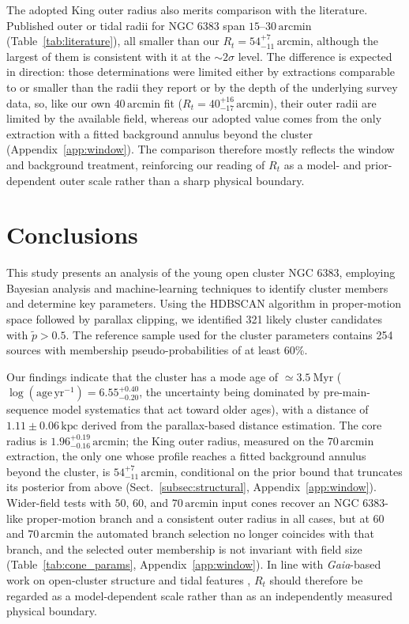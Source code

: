 \documentclass{aa}
\begin{document}
The adopted King outer radius also merits comparison with the literature. Published outer or tidal radii for NGC 6383 span $15$--$30\,\mathrm{arcmin}$ (Table~\ref{tab:literature}), all smaller than our $R_t=54^{+7}_{-11}\,\mathrm{arcmin}$, although the largest of them is consistent with it at the ${\sim}2\sigma$ level. The difference is expected in direction: those determinations were limited either by extractions comparable to or smaller than the radii they report or by the depth of the underlying survey data, so, like our own $40\,\mathrm{arcmin}$ fit ($R_t=40^{+16}_{-17}\,\mathrm{arcmin}$), their outer radii are limited by the available field, whereas our adopted value comes from the only extraction with a fitted background annulus beyond the cluster (Appendix~\ref{app:window}). The comparison therefore mostly reflects the window and background treatment, reinforcing our reading of $R_t$ as a model- and prior-dependent outer scale rather than a sharp physical boundary.

\section{Conclusions}\label{sec:conclusion}

This study presents an analysis of the young open cluster NGC 6383, employing Bayesian analysis and machine-learning techniques to identify cluster members and determine key parameters. Using the HDBSCAN algorithm in proper-motion space followed by parallax clipping, we identified 321 likely cluster candidates with $\tilde{p}>0.5$. The reference sample used for the cluster parameters contains 254 sources with membership pseudo-probabilities of at least 60\%.

Our findings indicate that the cluster has a mode age of $\simeq3.5~\mathrm{Myr}$ ($\log(\mathrm{age}\,\mathrm{yr^{-1}}) = 6.55^{+0.40}_{-0.20}$, the uncertainty being dominated by pre-main-sequence model systematics that act toward older ages), with a distance of $1.11 \pm 0.06\,\mathrm{kpc}$ derived from the parallax-based distance estimation. The core radius is $1.96^{+0.19}_{-0.16}\,\mathrm{arcmin}$; the King outer radius, measured on the $70\,\mathrm{arcmin}$ extraction, the only one whose profile reaches a fitted background annulus beyond the cluster, is $54^{+7}_{-11}\,\mathrm{arcmin}$, conditional on the prior bound that truncates its posterior from above (Sect.~\ref{subsec:structural}, Appendix~\ref{app:window}). Wider-field tests with $50$, $60$, and $70\,\mathrm{arcmin}$ input cones recover an NGC 6383-like proper-motion branch and a consistent outer radius in all cases, but at $60$ and $70\,\mathrm{arcmin}$ the automated branch selection no longer coincides with that branch, and the selected outer membership is not invariant with field size (Table~\ref{tab:cone_params}, Appendix~\ref{app:window}). In line with \textit{Gaia}-based work on open-cluster structure and tidal features \citep{2025MNRAS.539.2513A,2025A&A...694A.258R,2025A&A...698A.156X}, $R_t$ should therefore be regarded as a model-dependent scale rather than as an independently measured physical boundary.
\end{document}
